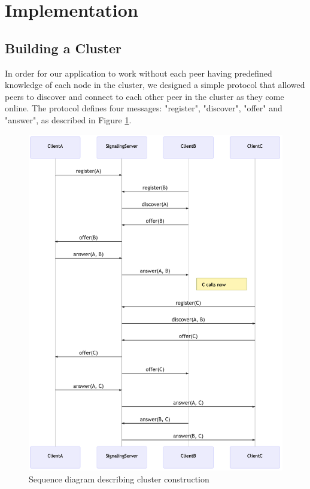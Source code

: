 \documentclass[11pt,twocolumn]{article}
\begin{document}
\section{Implementation}

\subsection{Building a Cluster}
In order for our application to work without each peer having predefined knowledge of each node in the cluster, we designed a simple protocol that allowed peers to discover and connect to each other peer in the cluster as they come online. The protocol defines four messages: "register", "discover", "offer" and "answer", as described in Figure \ref{fig:cluster}.

\begin{figure}[h]
    \centering
    \includegraphics[scale=0.32]{cluster}
    \caption{Sequence diagram describing cluster construction}
    \label{fig:cluster}
\end{figure}
\end{document}
